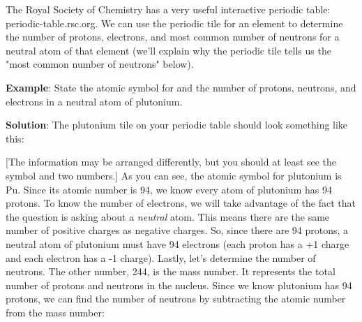 \begin{center}
\end{center}

The Royal Society of Chemistry has a very useful interactive periodic table:
periodic-table.rsc.org. We can use the periodic tile for an element to
determine the number of protons, electrons, and most common number of neutrons
for a neutral atom of that element (we'll explain why the periodic tile tells
us the "most common number of neutrons" below).

\textbf{Example}: State the atomic symbol for and the number of protons,
neutrons, and electrons in a neutral atom of plutonium.

\textbf{Solution}: The plutonium tile on your periodic table should look
something like this:
\begin{center}
\end{center}

[The information may be arranged differently, but you should at least see the
symbol and two numbers.] As you can see, the atomic symbol for plutonium is Pu.
Since its atomic number is 94, we know every atom of plutonium has 94 protons.
To know the number of electrons, we will take advantage of the fact that the
question is asking about a \textit{neutral} atom. This means there are the same
number of positive charges as negative charges. So, since there are 94 protons,
a neutral atom of plutonium must have 94 electrons (each proton has a +1 charge
and each electron has a -1 charge). Lastly, let's determine the number of
neutrons. The other number, 244, is the mass number. It represents the total
number of protons and neutrons in the nucleus. Since we know plutonium has 94
protons, we can find the number of neutrons by subtracting the atomic number
from the mass number:

\begin{center}
\end{center}

